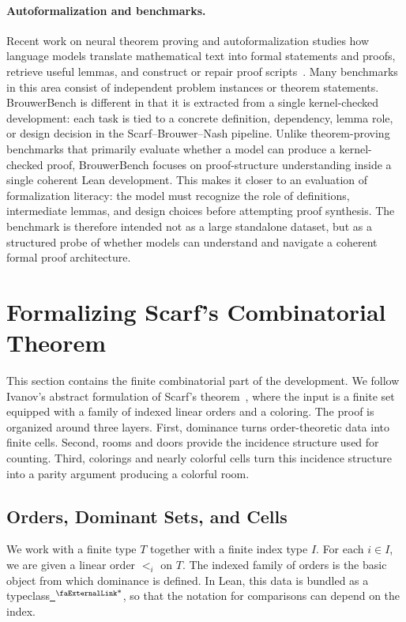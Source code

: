 \documentclass{article}
\theoremstyle{definition}
\newcommand{\extlink}{~\ensuremath{{}^\text{\faExternalLink*}}}
\begin{document}
\paragraph{Autoformalization and benchmarks.}
Recent work on neural theorem proving and autoformalization studies how
language models translate mathematical text into formal statements and proofs,
retrieve useful lemmas, and construct or repair proof scripts~\cite{polu2020generative,zheng2021minif2f}.
Many benchmarks in this area consist of independent problem instances or
theorem statements.  BrouwerBench is different in that it is extracted from a
single kernel-checked development: each task is tied to a concrete definition,
dependency, lemma role, or design decision in the Scarf--Brouwer--Nash pipeline.
Unlike theorem-proving benchmarks that primarily evaluate whether a model can
produce a kernel-checked proof, BrouwerBench focuses on proof-structure
understanding inside a single coherent Lean development.  This makes it closer
to an evaluation of formalization literacy: the model must recognize the role
of definitions, intermediate lemmas, and design choices before attempting proof
synthesis.  The benchmark is therefore intended not as a large standalone
dataset, but as a structured probe of whether models can understand and
navigate a coherent formal proof architecture.

\section{Formalizing Scarf's Combinatorial Theorem}\label{sec:Scarf}
This section contains the finite combinatorial part of the development. We follow Ivanov's abstract formulation of Scarf's theorem~\cite{ivanov2019beyond}, where the input is a finite set equipped with a family of indexed linear orders and a coloring. The proof is organized around three layers. First, dominance turns order-theoretic data into finite cells. Second, rooms and doors provide the incidence structure used for counting. Third, colorings and nearly colorful cells turn this incidence structure into a parity argument producing a colorful room.

\subsection{Orders, Dominant Sets, and Cells}\label{subsec:scarf-orders}

We work with a finite type $T$ together with a finite index type $I$. For each $i \in I$, we are given a linear order $<_i$ on $T$. The indexed family of orders is the basic object from which dominance is defined. In Lean, this data is bundled as a typeclass\href{https://github.com/Solo-ary/Game-Theory-Formalization/blob/7b49d5267d4f26b17bdf071250880b63e96999b6/Brouwer/Gametheory/Scarf.lean#L88-L93}{\extlink}, so that the notation for comparisons can depend on the index.
\end{document}

